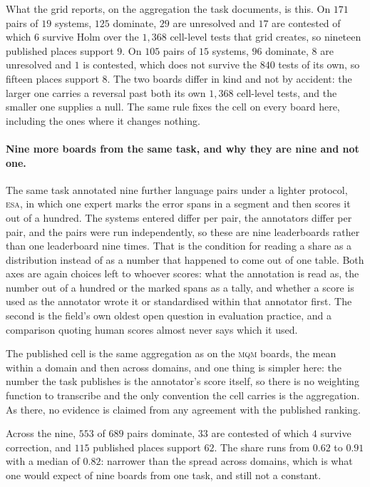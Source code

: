 What the grid reports, on the aggregation the task
documents, is this. On $171$ pairs of $19$ systems,
$125$ dominate, $29$ are unresolved and $17$ are
contested of which $6$ survive Holm over the $1{,}368$
cell-level tests that grid creates, so nineteen published places support
$9$. On $105$ pairs of $15$ systems,
$96$ dominate, $8$ are unresolved and $1$ is
contested, which does not survive the $840$ tests of its own, so fifteen places support
$8$. The two boards differ in kind and not by accident: the
larger one carries a reversal past both its own $1{,}368$ cell-level tests, and the smaller one
supplies a null.
The same rule fixes the cell on every board here, including the ones where it
changes nothing.

\paragraph{Nine more boards from the same task, and why they are nine and not one.} The same task
annotated nine further language pairs under a lighter protocol, \textsc{esa}, in which one expert
marks the error spans in a segment and then scores it out of a hundred. The systems entered differ
per pair, the annotators differ per pair, and the pairs were run independently, so these are nine leaderboards rather than one leaderboard nine times. That is the condition for reading a share
as a distribution instead of as a number that happened to come out of one table. Both axes are again
choices left to whoever scores: what the annotation is read as, the number out of a hundred or the
marked spans as a tally, and whether a score is used as the annotator wrote it or standardised
within that annotator first. The second is the field's own oldest open question in evaluation
practice, and a comparison quoting human scores almost never says which it used.

The published cell is the same aggregation as on the \textsc{mqm} boards, the mean within a domain
and then across domains, and one thing is simpler here: the number the task publishes is the
annotator's score itself, so there is no weighting function to transcribe and the only convention
the cell carries is the aggregation. As there, no evidence is claimed from any agreement with the
published ranking.

Across the nine, $553$ of $689$ pairs dominate, $33$ are contested of which $4$ survive correction, and $115$ published places support $62$. The share runs from $0.62$ to $0.91$ with a median of
$0.82$: narrower than the spread across domains, which is what one would expect of nine boards from
one task, and still not a constant.

